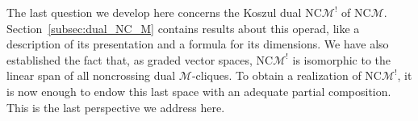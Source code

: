 \documentclass[10pt,reqno]{amsart}
\numberwithin{equation}{subsection}
\newcommand{\Mca}{\mathcal{M}}
\newcommand{\NC}{\mathrm{NC}}
\begin{document}
The last question we develop here concerns the Koszul dual $\NC\Mca^!$
of $\NC\Mca$. Section~\ref{subsec:dual_NC_M} contains results about this
operad, like a description of its presentation and a formula for its
dimensions. We have also established the fact that, as graded vector
spaces, $\NC\Mca^!$ is isomorphic to the linear span of all noncrossing
dual $\Mca$-cliques. To obtain a realization of $\NC\Mca^!$, it is now
enough to endow this last space with an adequate partial composition.
This is the last perspective we address here.
\medskip



\end{document}
